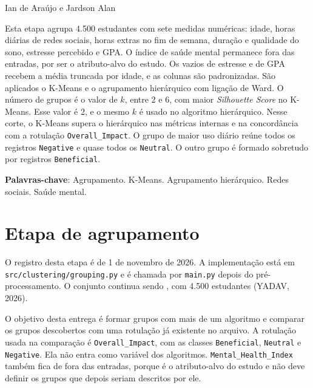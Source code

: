 \documentclass[
  article,
  12pt,
  oneside,
  a4paper,
  english,
  brazil,
  chapter=TITLE,
  section=TITLE,
  subsection=TITLE
]{abntex2}
\renewcommand{\imprimircapa}{%
  \begin{capa}%
    \SingleSpacing
    \begin{center}
      \imprimirinstituicao\par
      \vspace*{\fill}
      \imprimirautor\par
      \vspace*{\fill}
      {\bfseries\imprimirtitulo\par}
      \vspace*{\fill}
      \imprimirlocal\par
      \imprimirdata\par
    \end{center}
    \vspace*{1cm}
  \end{capa}%
}
\begin{document}
\pretextual
\imprimircapa
\imprimirfolhaderosto

\textual

\begin{center}
  \bfseries\imprimirtitulo
\end{center}

\vspace{0.75\baselineskip}
\noindent Ian de Araújo\footnotemark{} e Jardson Alan\footnotemark[\value{footnote}]

\begin{resumo}
Esta etapa agrupa 4.500 estudantes com sete medidas numéricas: idade, horas diárias de redes sociais, horas extras no fim de semana, duração e qualidade do sono, estresse percebido e GPA. O índice de saúde mental permanece fora das entradas, por ser o atributo-alvo do estudo. Os vazios de estresse e de GPA recebem a média truncada por idade, e as colunas são padronizadas. São aplicados o K-Means e o agrupamento hierárquico com ligação de Ward. O número de grupos é o valor de \(k\), entre 2 e 6, com maior \textit{Silhouette Score} no K-Means. Esse valor é 2, e o mesmo \(k\) é usado no algoritmo hierárquico. Nesse corte, o K-Means supera o hierárquico nas métricas internas e na concordância com a rotulação \texttt{Overall\_Impact}. O grupo de maior uso diário reúne todos os registros \texttt{Negative} e quase todos os \texttt{Neutral}. O outro grupo é formado sobretudo por registros \texttt{Beneficial}.

\vspace{\onelineskip}
\noindent
\textbf{Palavras-chave}: Agrupamento. K-Means. Agrupamento hierárquico. Redes sociais. Saúde mental.
\end{resumo}

\section{Etapa de agrupamento}

O registro desta etapa é de 1 de novembro de 2026. A implementação está em \texttt{src/clustering/}\allowbreak\texttt{grouping.py} e é chamada por \texttt{main.py} depois do pré-processamento. O conjunto continua sendo , com 4.500 estudantes (YADAV, 2026).

O objetivo desta entrega é formar grupos com mais de um algoritmo e comparar os grupos descobertos com uma rotulação já existente no arquivo. A rotulação usada na comparação é \texttt{Overall\_Impact}, com as classes \texttt{Beneficial}, \texttt{Neutral} e \texttt{Negative}. Ela não entra como variável dos algoritmos. \texttt{Mental\_Health\_Index} também fica de fora das entradas, porque é o atributo-alvo do estudo e não deve definir os grupos que depois seriam descritos por ele.
\end{document}
